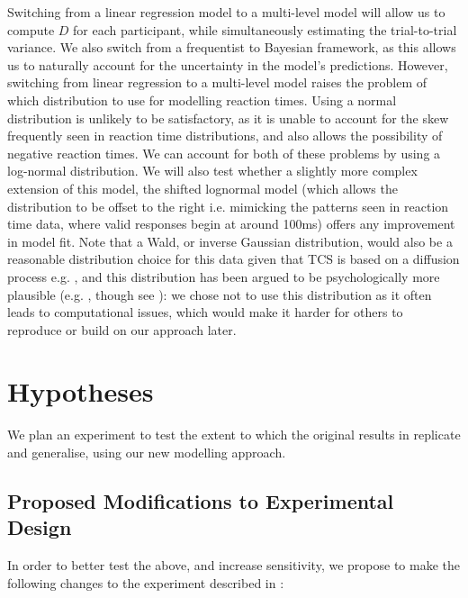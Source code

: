 \documentclass[preprint,12pt,authoryear]{elsarticle}
\begin{document}
Switching from a linear regression model to a multi-level model will allow us to compute $D$ for each participant, while simultaneously estimating the trial-to-trial variance. We also switch from a frequentist to Bayesian framework, as this allows us to naturally account for the uncertainty in the model’s predictions. However, switching from linear regression to a multi-level model raises the problem of which distribution to use for modelling reaction times. Using a normal distribution is unlikely to be satisfactory, as it is unable to account for the skew frequently seen in reaction time distributions, and also allows the possibility of negative reaction times. We can account for both of these problems by using a log-normal distribution. We will also test whether a slightly more complex extension of this model, the shifted lognormal model (which allows the distribution to be offset to the right i.e. mimicking the patterns seen in reaction time data, where valid responses begin at around 100ms) offers any improvement in model fit. Note that a Wald, or inverse Gaussian distribution, would also be a reasonable distribution choice for this data given that TCS is based on a diffusion process e.g. \citep{moran2013competitive}, and this distribution has been argued to be psychologically more plausible (e.g. \cite{kieffaber2006switch}, though see \cite{matzke2009psychological}): we chose not to use this distribution as it often leads to computational issues, which would make it harder for others to reproduce or build on our approach later.

\section{Hypotheses}

We plan an experiment to test the extent to which the original results in \cite{buetti2019predicting} replicate and generalise, using our new modelling approach.

\subsection{Proposed Modifications to Experimental Design}

In order to better test the above, and increase sensitivity, we propose to make the following changes to the experiment described in \cite{buetti2019predicting}:
\end{document}
